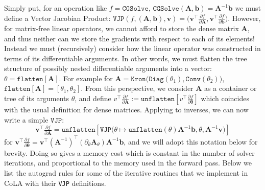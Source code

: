 \documentclass{article}
\newcommand{\mbf}[1]{{\boldsymbol{\mathbf{#1}}}}
\renewcommand{\bm}{\mbf}
\begin{document}
Simply put, for an operation like $f = \texttt{CGSolve}$, $\texttt{CGSolve}(\bm A, \bm{b}) = \bm A^{-1} \bm{b}$ we must define a Vector Jacobian Product: $\texttt{VJP}(f, (\bm A, \bm{b}), \bm{v}) = \big(\bm{v}^{\intercal} \frac{\partial f}{\partial \bm A}, \bm{v}^{\intercal} \frac{\partial f}{\partial \bm{b}}\big)$.
However, for matrix-free linear operators, we cannot afford to store the dense matrix $\bm A$, and thus neither can we store the gradients with respect to each of its elements!
Instead we must (recursively) consider how the linear operator was constructed in terms of its differentiable arguments.
In other words, we must flatten the tree structure of possibly nested differentiable arguments into a vector: $\theta = \texttt{flatten}[\bm A]$.
For example for $\bm A = \texttt{Kron}\big(\texttt{Diag}(\theta_1), \texttt{Conv}(\theta_2)\big)$, $\texttt{flatten}[\bm A] = [\theta_1,\theta_2]$.
From this perspective, we consider $\bm A$ as a container or tree of its arguments $\theta$,
and define $v^{\intercal} \frac{\partial f}{\partial \bm A}:= \texttt{unflatten}[v^{\intercal} \frac{\partial f}{\partial \bm \theta}]$
which coincides with the usual definition for dense matrices.
Applying to inverses, we can now write a simple $\texttt{VJP}$:
\begin{equation}
    \bm{v}^\intercal\tfrac{\partial f}{\partial \bm A}
    =
    \texttt{unflatten}[\texttt{VJP}\big(\theta \mapsto \texttt{unflatten}(\theta) \bm{A}^{-1} \bm{b}, \theta, \bm{A}^{-1} \bm{v}\big)]
\end{equation}
for $\bm v^{\intercal}\frac{\partial f}{\partial \bm \theta} =
\bm v^{\intercal} (\bm A^{-1})^{\intercal}(\partial_\theta \bm A_\theta)  \bm A^{-1}\bm b$, and we will adopt this notation below for brevity.
Doing so gives a memory cost which is constant in the number of solver iterations, and proportional to the memory used in the forward pass.
Below we list the autograd rules for some of the iterative routines that we implement in CoLA with their \texttt{VJP} definitions.
\end{document}
